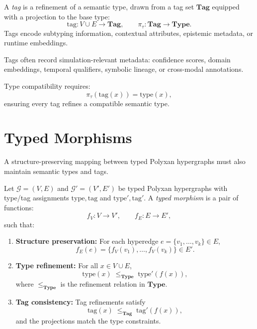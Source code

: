 \begin{definition}
A \emph{tag} is a refinement of a semantic type, drawn from a tag set $\mathbf{Tag}$ equipped with a projection to the base type:
\[
\mathrm{tag}: V \cup E \to \mathbf{Tag},
\qquad
\pi_\tau : \mathbf{Tag} \to \mathbf{Type}.
\]
Tags encode subtyping information, contextual attributes, epistemic metadata, or runtime embeddings.
\end{definition}

\begin{remark}
Tags often record simulation-relevant metadata:
confidence scores, domain embeddings, temporal qualifiers, symbolic lineage, or cross-modal annotations.
\end{remark}

Type compatibility requires:
\[
\pi_\tau(\mathrm{tag}(x)) = \mathrm{type}(x),
\]
ensuring every tag refines a compatible semantic type.

\section{Typed Morphisms}

A structure-preserving mapping between typed Polyxan hypergraphs must also maintain semantic types and tags.

\begin{definition}
Let $\mathcal{G}=(V,E)$ and $\mathcal{G}'=(V',E')$ be typed Polyxan hypergraphs with type/tag assignments $\mathrm{type},\mathrm{tag}$ and $\mathrm{type}',\mathrm{tag}'$.  
A \emph{typed morphism} is a pair of functions:
\[
f_V : V \to V',
\qquad
f_E : E \to E',
\]
such that:

\begin{enumerate}
\item \textbf{Structure preservation:}  
For each hyperedge $e = \{v_1,\dots,v_k\} \in E$,
\[
f_E(e) = \{f_V(v_1),\dots,f_V(v_k)\} \in E'.
\]

\item \textbf{Type refinement:}  
For all $x \in V \cup E$,
\[
\mathrm{type}(x) \;\le_{\mathbf{Type}}\; \mathrm{type}'(f(x)),
\]
where $\le_{\mathbf{Type}}$ is the refinement relation in $\mathbf{Type}$.

\item \textbf{Tag consistency:}  
Tag refinements satisfy
\[
\mathrm{tag}(x) \;\le_{\mathbf{Tag}}\; \mathrm{tag}'(f(x)),
\]
and the projections match the type constraints.
\end{enumerate}
\end{definition}

